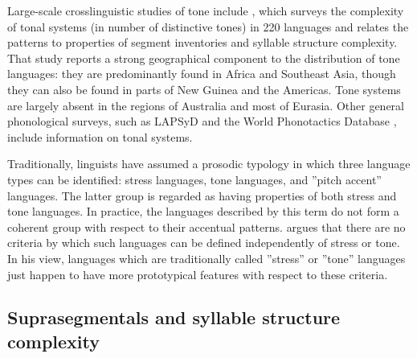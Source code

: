   Large-scale crosslinguistic studies of tone include \citet{Maddieson2013d}, which surveys the complexity of tonal systems (in number of distinctive tones) in 220 languages and relates the patterns to properties of segment inventories and syllable structure complexity. That study reports a strong geographical component to the distribution of tone languages: they are predominantly found in Africa and Southeast Asia, though they can also be found in parts of New Guinea and the Americas. Tone systems are largely absent in the regions of Australia and most of Eurasia. Other general phonological surveys, such as LAPSyD \citep{MaddiesonEtAl2013} and the World Phonotactics Database \citep{DonohueEtAl2013}, include information on tonal systems.

  Traditionally, linguists have assumed a prosodic typology in which three language types can be identified: stress languages, tone languages, and ”pitch accent” languages. The latter group is regarded as having properties of both stress and tone languages. In practice, the languages described by this term do not form a coherent group with respect to their accentual patterns. \citet{Hyman2009} argues that there are no criteria by which such languages can be defined independently of stress or tone. In his view, languages which are traditionally called ”stress” or ”tone” languages just happen to have more prototypical features with respect to these criteria.

\subsection{Suprasegmentals and syllable structure complexity}\label{sec:5.1.2}

